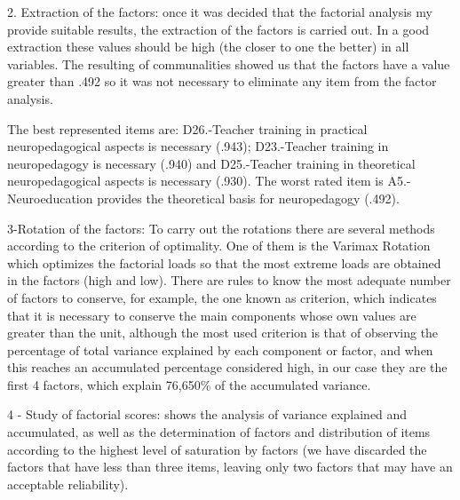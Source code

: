 \documentclass[english]{textolivre}
\begin{document}
2. Extraction of the factors: once it was decided that the factorial analysis my provide suitable results, the extraction of the factors is carried out. In a good extraction these values should be high (the closer to one the better) in all variables. The resulting of communalities showed us that the factors have a value greater than .492 so it was not necessary to eliminate any item from the factor analysis.

The best represented items are: D26.-Teacher training in practical neuropedagogical aspects is necessary (.943); D23.-Teacher training in neuropedagogy is necessary (.940) and D25.-Teacher training in theoretical neuropedagogical aspects is necessary (.930). The worst rated item is A5.-Neuroeducation provides the theoretical basis for neuropedagogy (.492).

3-Rotation of the factors: To carry out the rotations there are several methods according to the criterion of optimality. One of them is the Varimax Rotation which optimizes the factorial loads so that the most extreme loads are obtained in the factors (high and low). There are rules to know the most adequate number of factors to conserve, for example, the one known as  criterion, which indicates that it is necessary to conserve the main components whose own values are greater than the unit, although the most used criterion is that of observing the percentage of total variance explained by each component or factor, and when this reaches an accumulated percentage considered high, in our case they are the first 4 factors, which explain 76,650\% of the accumulated variance.

4 - Study of factorial scores:  shows the analysis of variance explained and accumulated, as well as the determination of factors and distribution of items according to the highest level of saturation by factors (we have discarded the factors that have less than three items, leaving only two factors that may have an acceptable reliability).
\end{document}

